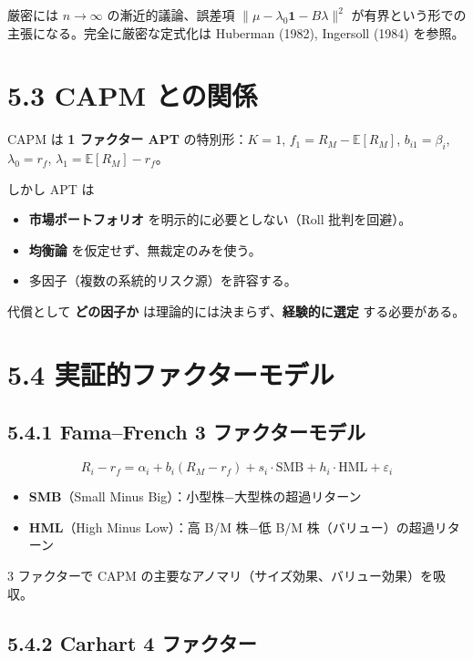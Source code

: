 \documentclass[11pt,a4paper]{report}
\begin{document}
厳密には $n \to \infty$ の漸近的議論、誤差項 $\|\mu - \lambda_0\mathbf{1} - B\lambda\|^2$ が有界という形での主張になる。完全に厳密な定式化は Huberman (1982), Ingersoll (1984) を参照。

\section{5.3 CAPM との関係}

CAPM は \textbf{1 ファクター APT} の特別形：$K = 1$, $f_1 = R_M - \mathbb{E}[R_M]$, $b_{i1} = \beta_i$, $\lambda_0 = r_f$, $\lambda_1 = \mathbb{E}[R_M] - r_f$。

しかし APT は

\begin{itemize}
\item \textbf{市場ポートフォリオ} を明示的に必要としない（Roll 批判を回避）。
\item \textbf{均衡論} を仮定せず、無裁定のみを使う。
\item 多因子（複数の系統的リスク源）を許容する。
\end{itemize}

代償として \textbf{どの因子か} は理論的には決まらず、\textbf{経験的に選定} する必要がある。

\section{5.4 実証的ファクターモデル}

\subsection{5.4.1 Fama–French 3 ファクターモデル}

\[ R_i - r_f = \alpha_i + b_i (R_M - r_f) + s_i \cdot \mathrm{SMB} + h_i \cdot \mathrm{HML} + \varepsilon_i \]
\begin{itemize}
\item \textbf{SMB}（Small Minus Big）：小型株−大型株の超過リターン
\item \textbf{HML}（High Minus Low）：高 B/M 株−低 B/M 株（バリュー）の超過リターン
\end{itemize}

3 ファクターで CAPM の主要なアノマリ（サイズ効果、バリュー効果）を吸収。

\subsection{5.4.2 Carhart 4 ファクター}
\end{document}
